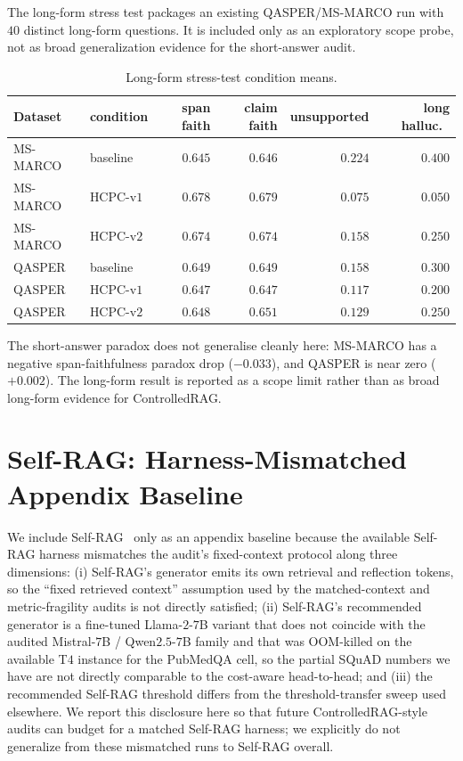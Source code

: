 \documentclass[11pt]{article}
\begin{document}
The long-form stress test packages an existing QASPER/MS-MARCO run
with $40$ distinct long-form questions. It is included only as an
exploratory scope probe, not as broad generalization evidence for the
short-answer audit.

\begin{table}[!htb]
\centering
\caption{Long-form stress-test condition means.}
\footnotesize
\begin{tabular}{llrrrr}
\toprule
Dataset & condition & span faith & claim faith & unsupported & long halluc.\ \\
\midrule
MS-MARCO & baseline   & $0.645$ & $0.646$ & $0.224$ & $0.400$ \\
MS-MARCO & HCPC-v$1$  & $0.678$ & $0.679$ & $0.075$ & $0.050$ \\
MS-MARCO & HCPC-v$2$  & $0.674$ & $0.674$ & $0.158$ & $0.250$ \\
QASPER   & baseline   & $0.649$ & $0.649$ & $0.158$ & $0.300$ \\
QASPER   & HCPC-v$1$  & $0.647$ & $0.647$ & $0.117$ & $0.200$ \\
QASPER   & HCPC-v$2$  & $0.648$ & $0.651$ & $0.129$ & $0.250$ \\
\bottomrule
\end{tabular}
\end{table}

The short-answer paradox does not generalise cleanly here: MS-MARCO has
a negative span-faithfulness paradox drop ($-0.033$), and QASPER is
near zero ($+0.002$). The long-form result is reported as a scope
limit rather than as broad long-form evidence for ControlledRAG.

\section{Self-RAG: Harness-Mismatched Appendix Baseline}
\label{supp:selfrag}

We include Self-RAG~\citep{asai2024selfrag} only as an appendix
baseline because the available Self-RAG harness mismatches the audit's
fixed-context protocol along three dimensions: (i) Self-RAG's
generator emits its own retrieval and reflection tokens, so the
``fixed retrieved context'' assumption used by the matched-context and
metric-fragility audits is not directly satisfied; (ii) Self-RAG's
recommended generator is a fine-tuned Llama-$2$-$7$B variant that does
not coincide with the audited Mistral-$7$B / Qwen$2.5$-$7$B family
and that was OOM-killed on the available T$4$ instance for the
PubMedQA cell, so the partial SQuAD numbers we have are not directly
comparable to the cost-aware head-to-head; and (iii) the
recommended Self-RAG threshold differs from the threshold-transfer
sweep used elsewhere. We report this disclosure here so that future
ControlledRAG-style audits can budget for a matched Self-RAG harness;
we explicitly do not generalize from these mismatched runs to Self-RAG
overall.
\end{document}
